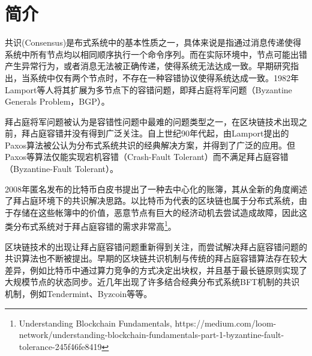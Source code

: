 \section{简介}
共识(Consensus)是布式系统中的基本性质之一，具体来说是指通过消息传递使得系统中所有节点均以相同顺序执行一个命令序列\cite{lamport1978implementation}。而在实际环境中，节点可能出错产生异常行为，或者消息无法被正确传递，使得系统无法达成一致\cite{pease1980reaching}。早期研究指出，当系统中仅有两个节点时，不存在一种容错协议使得系统达成一致\cite{akkoyunlu1975some}。1982年Lamport等人将其扩展为多节点下的容错问题，即拜占庭将军问题（Byzantine Generals Problem，BGP）\cite{lamport1982byzantine}。

拜占庭将军问题被认为是容错性问题中最难的问题类型之一，在区块链技术出现之前，拜占庭容错并没有得到广泛关注。自上世纪90年代起，由Lamport提出的Paxos算法\cite{lamport2001paxos}被公认为分布式系统共识的经典解决方案\cite{chandra2007paxos}，并得到了广泛的应用\cite{burrows2006chubby,chang2008bigtable,ghemawat2003google}。但Paxos等算法仅能实现宕机容错（Crash-Fault Tolerant）而不满足拜占庭容错（Byzantine-Fault Tolerant）。

2008年匿名发布的比特币白皮书\cite{nakamoto2008bitcoin}提出了一种去中心化的账簿，其从全新的角度阐述了拜占庭环境下的共识解决思路。以比特币为代表的区块链也属于分布式系统，由于存储在这些帐簿中的价值，恶意节点有巨大的经济动机去尝试造成故障，因此这类分布式系统对于拜占庭容错的需求非常高\footnote{Understanding Blockchain Fundamentals, https://medium.com/loom-network/understanding-blockchain-fundamentals-part-1-byzantine-fault-tolerance-245f46fe8419}。

区块链技术的出现让拜占庭容错问题重新得到关注，而尝试解决拜占庭容错问题的共识算法也不断被提出。早期的区块链共识机制与传统的拜占庭容错算法存在较大差异，例如比特币中通过算力竞争的方式决定出块权，并且基于最长链原则实现了大规模节点的状态同步\cite{nakamoto2008bitcoin}。近几年出现了许多结合经典分布式系统BFT机制的共识机制，例如Tendermint\cite{buchman2016tendermint}、Byzcoin\cite{kogias2016enhancing}等等。






